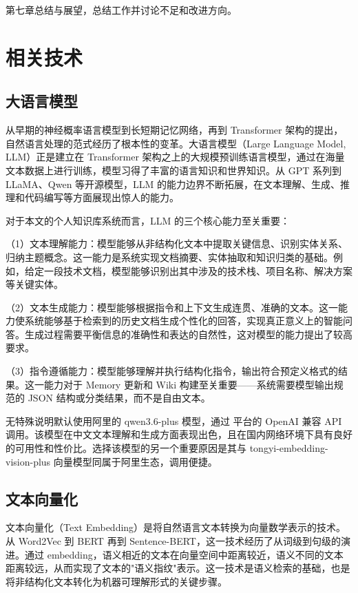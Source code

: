 第七章总结与展望，总结工作并讨论不足和改进方向。

\newpage

\section{相关技术}

\subsection{大语言模型}

从早期的神经概率语言模型\cite{bengio2003nplm}到长短期记忆网络\cite{hochreiter1997lstm}，再到 Transformer 架构\cite{vaswani2017attention}的提出，自然语言处理的范式经历了根本性的变革。大语言模型（Large Language Model, LLM）正是建立在 Transformer 架构之上的大规模预训练语言模型，通过在海量文本数据上进行训练，模型习得了丰富的语言知识和世界知识。从 GPT 系列到 LLaMA、Qwen 等开源模型，LLM 的能力边界不断拓展，在文本理解、生成、推理和代码编写等方面展现出惊人的能力。

对于本文的个人知识库系统而言，LLM 的三个核心能力至关重要：

（1）文本理解能力：模型能够从非结构化文本中提取关键信息、识别实体关系、归纳主题概念。这一能力是系统实现文档摘要、实体抽取和知识归类的基础。例如，给定一段技术文档，模型能够识别出其中涉及的技术栈、项目名称、解决方案等关键实体。

（2）文本生成能力：模型能够根据指令和上下文生成连贯、准确的文本。这一能力使系统能够基于检索到的历史文档生成个性化的回答，实现真正意义上的智能问答。生成过程需要平衡信息的准确性和表达的自然性，这对模型的能力提出了较高要求。

（3）指令遵循能力：模型能够理解并执行结构化指令，输出符合预定义格式的结果。这一能力对于 Memory 更新和 Wiki 构建至关重要——系统需要模型输出规范的 JSON 结构或分类结果，而不是自由文本。

无特殊说明默认使用阿里的 qwen3.6-plus 模型，通过  平台的 OpenAI 兼容 API 调用。该模型在中文文本理解和生成方面表现出色，且在国内网络环境下具有良好的可用性和性价比。选择该模型的另一个重要原因是其与 tongyi-embedding-vision-plus 向量模型同属于阿里生态，调用便捷。

\subsection{文本向量化}

文本向量化（Text Embedding）是将自然语言文本转换为向量数学表示的技术。从 Word2Vec\cite{mikolov2013word2vec} 到 BERT\cite{devlin2019bert} 再到 Sentence-BERT\cite{reimers2019sbert}，这一技术经历了从词级到句级的演进。通过 embedding，语义相近的文本在向量空间中距离较近，语义不同的文本距离较远，从而实现了文本的"语义指纹"表示。这一技术是语义检索的基础，也是将非结构化文本转化为机器可理解形式的关键步骤。

